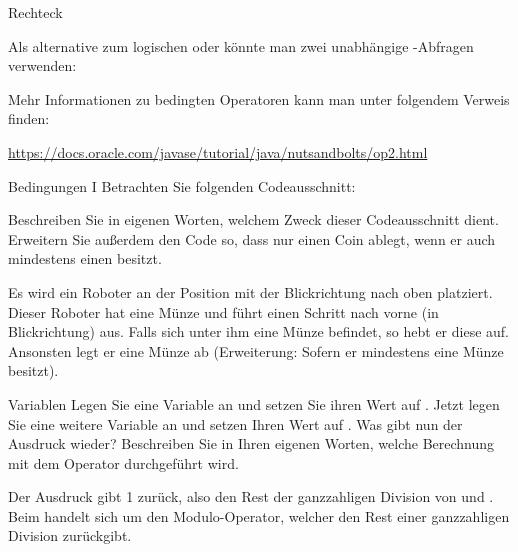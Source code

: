\documentclass{../tuda-exercise}
\begin{document}
\begin{task}[credit=\stars{1}{3}]{Rechteck}
\begin{solution}
\begin{note}[title=Information:]
        Als alternative zum logischen oder könnte man zwei unabhängige -Abfragen
        verwenden:

        

        Mehr Informationen zu bedingten Operatoren kann man unter folgendem Verweis finden:

        \begin{center}
          \url{https://docs.oracle.com/javase/tutorial/java/nutsandbolts/op2.html}
        \end{center}
      \end{note}
    \end{solution}
  \end{task}

  \begin{task}[credit=\stars{1}{3}]{Bedingungen I}
    Betrachten Sie folgenden Codeausschnitt:

    

    Beschreiben Sie in eigenen Worten, welchem Zweck dieser Codeausschnitt dient. Erweitern Sie
    außerdem den Code so, dass  nur einen Coin ablegt, wenn er auch mindestens
    einen besitzt.

    \clearpagesolution

    \begin{solution}
      Es wird ein Roboter an der Position  mit der Blickrichtung nach oben
      platziert. Dieser Roboter hat eine Münze und führt einen Schritt nach vorne (in
      Blickrichtung) aus. Falls sich unter ihm eine Münze befindet, so hebt er diese auf.
      Ansonsten legt er eine Münze ab (Erweiterung: Sofern er mindestens eine Münze besitzt).

      
    \end{solution}
  \end{task}

  \begin{task}[credit=\stars{1}{3}]{Variablen}
    Legen Sie eine Variable  an und setzen Sie ihren Wert auf .
    Jetzt legen Sie eine weitere Variable  an und setzen Ihren Wert auf
    . Was gibt nun der Ausdruck  wieder? Beschreiben
    Sie in Ihren eigenen Worten, welche Berechnung mit dem \inlinejava{\%} Operator durchgeführt
    wird.

    \begin{solution}
      Der Ausdruck gibt 1 zurück, also den Rest der ganzzahligen Division von  und
      . Beim \inlinejava{\%} handelt sich um den Modulo-Operator, welcher den Rest
      einer ganzzahligen Division zurückgibt.
    \end{solution}
  \end{task}
\end{document}
